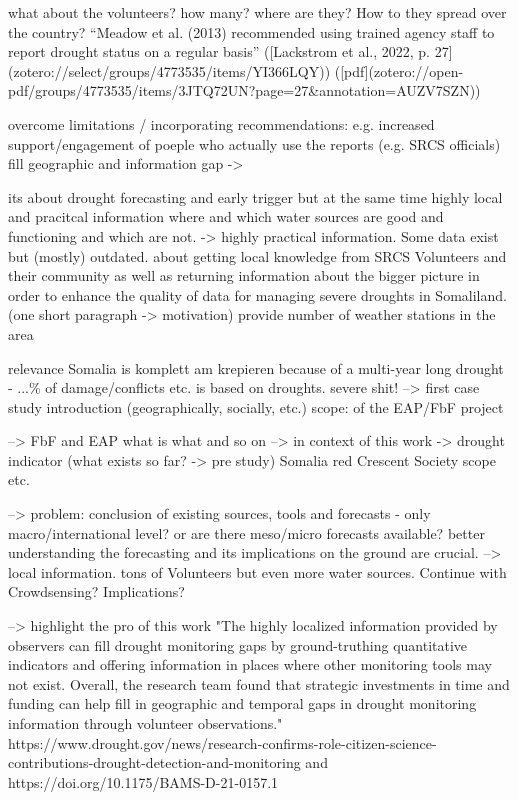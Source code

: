what about the volunteers? how many? where are they? How to they spread over the country?
“Meadow et al. (2013) recommended using trained agency staff to report drought status on a regular basis” ([Lackstrom et al., 2022, p. 27](zotero://select/groups/4773535/items/YI366LQY)) ([pdf](zotero://open-pdf/groups/4773535/items/3JTQ72UN?page=27\&annotation=AUZV7SZN))

overcome limitations / incorporating recommendations: e.g. increased support/engagement of poeple who actually use the reports (e.g. SRCS officials) 
fill geographic and information gap ->

its about drought forecasting and early trigger but at the same time highly local and pracitcal information where and which water sources are good and functioning and which are not. -> highly practical information. Some data exist but (mostly) outdated.
about getting local knowledge from SRCS Volunteers and their community as well as returning information about the bigger picture
in order to enhance the quality of data for managing severe droughts in Somaliland. (one short paragraph -> motivation)
provide number of weather stations in the area

relevance
Somalia is komplett am krepieren because of a multi-year long drought - ...\% of damage/conflicts etc. is based on droughts. severe shit! --> first case study introduction (geographically, socially, etc.) 
scope: of the EAP/FbF project

--> FbF and EAP what is what and so on --> in context of this work -> drought indicator (what exists so far? -> pre study)
Somalia red Crescent Society scope etc. 

--> problem: conclusion of existing sources, tools and forecasts - only macro/international level? or are there meso/micro forecasts available?
better understanding the forecasting and its implications on the ground are crucial. --> local information. tons of Volunteers but even more water sources. Continue with Crowdsensing? Implications?

--> highlight the pro of this work
"The highly localized information provided by observers can fill drought monitoring gaps by ground-truthing quantitative indicators and offering information in places where other monitoring tools may not exist. Overall, the research team found that strategic investments in time and funding can help fill in geographic and temporal gaps in drought monitoring information through volunteer observations."
https://www.drought.gov/news/research-confirms-role-citizen-science-contributions-drought-detection-and-monitoring and https://doi.org/10.1175/BAMS-D-21-0157.1

